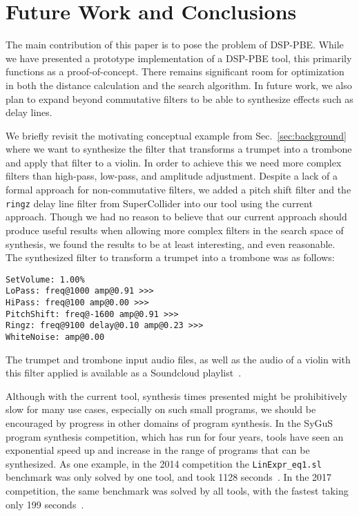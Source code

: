 \section{Future Work and Conclusions}
\label{sec:future}

The main contribution of this paper is to pose the problem of DSP-PBE.
While we have presented a prototype implementation of a DSP-PBE tool, this primarily functions as a proof-of-concept.
There remains significant room for optimization in both the distance calculation and the search algorithm.
In future work, we also plan to expand beyond commutative filters to be able to synthesize effects such as delay lines.

We briefly revisit the motivating conceptual example from Sec.~\ref{sec:background} where we want to synthesize the filter that transforms a trumpet into a trombone and apply that filter to a violin.
In order to achieve this we need more complex filters than high-pass, low-pass, and amplitude adjustment.
Despite a lack of a formal approach for non-commutative filters, we added a pitch shift filter and the \texttt{ringz} delay line filter from SuperCollider into our tool using the current approach.
Though we had no reason to believe that our current approach should produce useful results when allowing more complex filters in the search space of synthesis, we found the results to be at least interesting, and even reasonable.
The synthesized filter to transform a trumpet into a trombone was as follows:

\begin{lstlisting}
SetVolume: 1.00% 
LoPass: freq@1000 amp@0.91 >>> 
HiPass: freq@100 amp@0.00 >>> 
PitchShift: freq@-1600 amp@0.91 >>> 
Ringz: freq@9100 delay@0.10 amp@0.23 >>> 
WhiteNoise: amp@0.00
\end{lstlisting}

The trumpet and trombone input audio files, as well as the audio of a violin with this filter applied is available as a Soundcloud playlist~\cite{soundcloudAudio}.

Although with the current tool, synthesis times presented might be prohibitively slow for many use cases, especially on such small programs, we should be encouraged by progress in other domains of program synthesis.
In the SyGuS program synthesis competition, which has run for four years, tools have seen an exponential speed up and increase in the range of programs that can be synthesized.
As one example, in the 2014 competition the \texttt{LinExpr\_eq1.sl} benchmark was only solved by one tool, and took 1128 seconds~\cite{sygus2014}.
In the 2017 competition, the same benchmark was solved by all tools, with the fastest taking only 199 seconds~\cite{sygus2017}.
